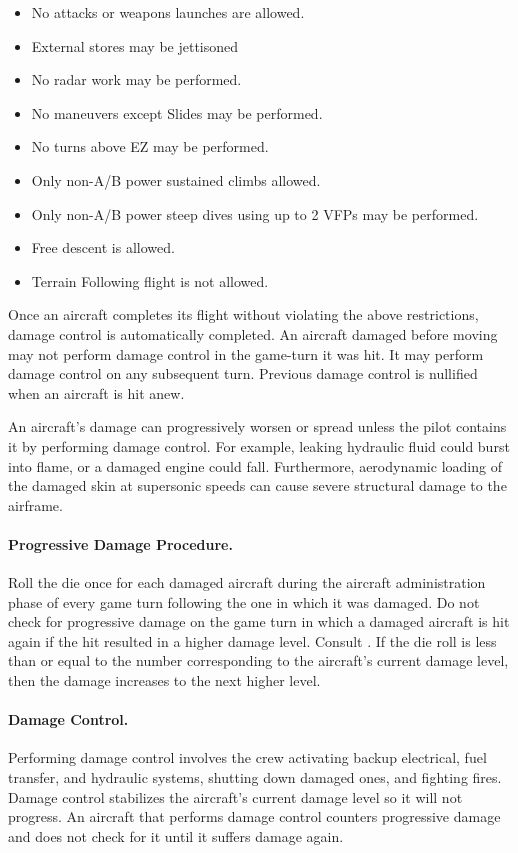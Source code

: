 \begin{advancedrules}
{\begin{itemize}
    \item No attacks or weapons launches are allowed.
    \item External stores may be jettisoned
    \item No radar work may be performed.
    \item No maneuvers except Slides may be performed.
    \item No turns above EZ may be performed.
    \item Only non-A/B power sustained climbs allowed.
    \item Only non-A/B power steep dives using up to 2 VFPs may be performed.
    \item Free descent is allowed.
    \item Terrain Following flight is not allowed.
\end{itemize}

Once an aircraft completes its flight without violating the above restrictions, damage control is automatically completed. An aircraft damaged before moving may not perform damage control in the game-turn it was hit. It may perform damage control on any subsequent turn. Previous damage control is nullified when an aircraft is hit anew.
}{

An aircraft's damage can progressively worsen or spread unless the pilot contains it by performing damage control. For example, leaking hydraulic fluid could burst into flame, or a damaged engine could fall. Furthermore, aerodynamic loading of the damaged skin at supersonic speeds can cause severe structural damage to the airframe.

\paragraph{Progressive Damage Procedure.} Roll the die once for each damaged aircraft during the aircraft administration phase of every game turn following the one in which it was damaged. Do not check for progressive damage on the game turn in which a damaged aircraft is hit again if the hit resulted in a higher damage level. Consult . If the die roll is less than or equal to the number corresponding to the aircraft's current damage level, then the damage increases to the next higher level.

\paragraph{Damage Control.} Performing damage control involves the crew activating backup electrical, fuel transfer, and hydraulic systems, shutting down damaged ones, and fighting fires. Damage control stabilizes the aircraft's current damage level so it will not progress. An aircraft that performs damage control counters progressive damage and does not check for it until it suffers damage again.

}
\end{advancedrules}
